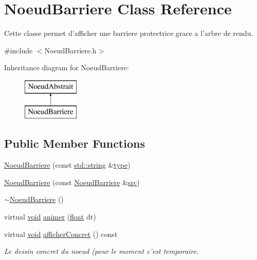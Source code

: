 \hypertarget{class_noeud_barriere}{\section{Noeud\-Barriere Class Reference}
\label{class_noeud_barriere}
}


Cette classe permet d'afficher une barriere protectrice grace a l'arbre de rendu.  




{\ttfamily \#include $<$Noeud\-Barriere.\-h$>$}

Inheritance diagram for Noeud\-Barriere\-:\begin{figure}[H]
\begin{center}
\leavevmode
\includegraphics[height=2.000000cm]{class_noeud_barriere}
\end{center}
\end{figure}
\subsection*{Public Member Functions}
\begin{DoxyCompactItemize}
\item 
\hyperlink{class_noeud_barriere_ac2ded5cbd09486327739b9a1eff2a88f}{Noeud\-Barriere} (const \hyperlink{glew_8h_ae84541b4f3d8e1ea24ec0f466a8c568b}{std\-::string} \&\hyperlink{fmod_8h_a5338b9cb3874378d7e5adfbe80a8a381}{type})
\item 
\hyperlink{class_noeud_barriere_a0f9e6ae182c7eb58fcadfd96f16adc40}{Noeud\-Barriere} (const \hyperlink{class_noeud_barriere}{Noeud\-Barriere} \&\hyperlink{glew_8h_a72e0fdf0f845ded60b1fada9e9195cd7}{src})
\item 
\hyperlink{class_noeud_barriere_a1a1b0a7ae1c14dcbcac0f6a2a1660ce1}{$\sim$\-Noeud\-Barriere} ()
\item 
virtual \hyperlink{wglew_8h_aeea6e3dfae3acf232096f57d2d57f084}{void} \hyperlink{class_noeud_barriere_a5abfc301214b16756cc0bebc6422660a}{animer} (\hyperlink{fmod_8h_aeb841aa4b4b5f444b5d739d865b420af}{float} dt)
\item 
virtual \hyperlink{wglew_8h_aeea6e3dfae3acf232096f57d2d57f084}{void} \hyperlink{class_noeud_barriere_a7a8838b9f73166d2548cfff11a0386b7}{afficher\-Concret} () const 
\begin{DoxyCompactList}\small\item\em Le dessin concret du noeud (pour le moment c'est temporaire. \end{DoxyCompactList}\end{DoxyCompactItemize}
